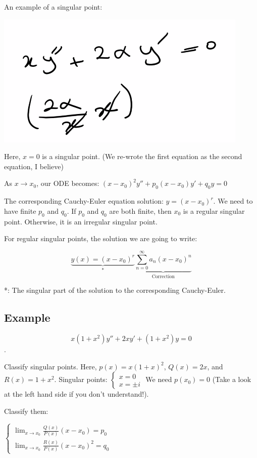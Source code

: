 An example of a singular point:

\includegraphics[width = 0.6 \textwidth]{image1.png}

Here, $x = 0$ is a singular point. (We re-wrote the first equation as the second equation, I believe)

\hfill \break

As $x \longrightarrow x_0$, our ODE becomes: $(x - x_0)^2 y'' + p_0 (x - x_0) y' + q_0 y = 0$

The corresponding Cauchy-Euler equation solution: $y = (x - x_0)^r$. We need to have finite $p_0$ and $q_0$. If $p_0$ and $q_0$ are both finite, then $x_0$ is a regular singular point. Otherwise, it is an irregular singular point. 

For regular singular points, the solution we are going to write: 

$$\underbrace{y(x) = (x - x_0)^r}_{*} \underbrace{\sum_{n = 0}^{\infty} a_n (x - x_0)^n}_{\text{Correction}}$$

*: The singular part of the solution to the corresponding Cauchy-Euler. 

\subsection{Example}

$$x(1+x^2) y'' + 2xy' + (1+x^2) y = 0$$. 

Classify singular points. Here, $p(x) = x(1+x)^2$, $Q(x) = 2x$, and $R(x) = 1+x^2$. Singular points: $\left\{ \begin{matrix} x = 0 \\ x = \pm i \end{matrix} \right.$ We need $p(x_0) = 0$ (Take a look at the left hand side if you don't understand!). 

Classify them:

$\left\{ \begin{matrix} \lim_{x \rightarrow x_0} \frac{Q(x)}{P(x)} (x - x_0) = p_0 \\ \lim_{x \rightarrow x_0} \frac{R(x)}{P(x)} (x - x_0)^2 = q_0 \end{matrix} \right.$

